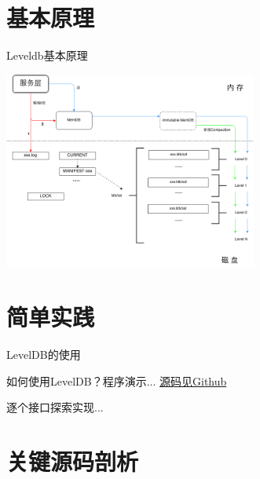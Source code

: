 \documentclass[CJK, 8pt]{beamer}
\begin{document}
\begin{CJK*}{UTF8}{gkai}
\section{基本原理}
\begin{frame}{Leveldb基本原理}
\begin{center}
\includegraphics[height=6.5cm]{leveldb-arch-diagram.png}
\end{center}
\end{frame}

\section{简单实践}
\begin{frame}{LevelDB的使用}
\begin{block}{}
如何使用LevelDB？程序演示... {\color{blue}\href{https://github.com/HappyTechGroup/1st-phase/tree/master/leveldb/code}{源码见Github}}

逐个接口探索实现...
\end{block}
\end{frame}

\section{关键源码剖析}


\end{CJK*}
\end{document}

